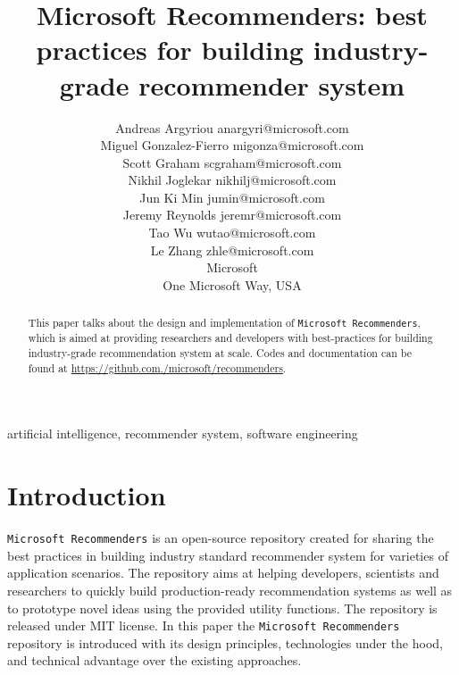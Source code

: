 \documentclass[twoside,11pt]{article}
\begin{document}
\title{Microsoft Recommenders: best practices for building industry-grade recommender system}

\author{\name Andreas Argyriou \email anargyri@microsoft.com \\
  \name Miguel Gonzalez-Fierro \email migonza@microsoft.com \\
  \name Scott Graham \email scgraham@microsoft.com \\
  \name Nikhil Joglekar \email nikhilj@microsoft.com \\
  \name Jun Ki Min \email jumin@microsoft.com \\
  \name Jeremy Reynolds \email jeremr@microsoft.com \\
  \name Tao Wu \email wutao@microsoft.com \\
  \name Le Zhang \email zhle@microsoft.com \\
  \addr Microsoft \\
  One Microsoft Way, USA
}


\maketitle

\begin{abstract}%
  This paper talks about the design and implementation of \verb|Microsoft Recommenders|, which is aimed at providing researchers and developers with best-practices for building  industry-grade recommendation system at scale. Codes and documentation can be found at \url{https://github.com./microsoft/recommenders}. 
\end{abstract}

\begin{keywords}
  artificial intelligence, recommender system, software engineering
\end{keywords}

\section{Introduction}
\verb|Microsoft Recommenders| is an open-source repository created for sharing the best practices in building industry standard recommender system for varieties of application scenarios. The repository aims at helping developers, scientists and researchers to quickly build production-ready recommendation systems as well as to prototype novel ideas using the provided utility functions. The repository is released under MIT license. In this paper the \verb|Microsoft Recommenders| repository is introduced with its design principles, technologies under the hood, and technical advantage over the existing approaches.
\end{document}
